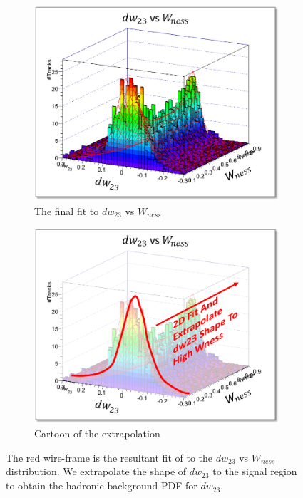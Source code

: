 \begin{figure}
  \centering
	\begin{subfigure}[t]{0.5\textwidth}
		\centering
    \includegraphics[width=0.95\linewidth]{./figures/dw23_vs_eta_3D.png}
    \caption{The final fit to $dw_{23}$ vs $W_{ness}$}
		\label{fig:3Ddw23_wness}
	\end{subfigure}%
  \begin{subfigure}[t]{0.5\textwidth}
		\centering
		\includegraphics[width=0.95\linewidth]{./figures/dw23_vs_eta_3D_overlay.png}
    \caption{Cartoon of the extrapolation}
		\label{fig:3Ddw23_wness_overlay}
	\end{subfigure}
  \caption{
    The red wire-frame is the resultant fit of to the $dw_{23}$ vs $W_{ness}$
    distribution. We extrapolate the shape of $dw_{23}$ to the signal region to
    obtain the hadronic background PDF for $dw_{23}$.
  }
  \label{fig:dw23_fits}
\end{figure}


